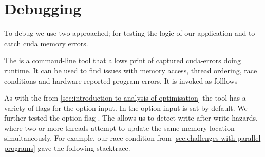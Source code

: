 \section{Debugging}
\label{sec:debugging and profiling}
To debug we use two approached;  for testing the logic of our application and  to catch cuda memory errors.

The  is a command-line tool that allows print of captured cuda-errors doing runtime.
It can be used to find issues with memory access, thread ordering, race conditions and hardware reported program errors.
It is invoked as folllows
%
\begin{quote}
\end{quote}
%
As with the  from \cref{sec:introduction to analysis of optimisation} the  tool has a variety of flags for the option input.
In the option input  is sat by default.
We further tested the option flag .
The  allows us to detect write-after-write hazards, where two or more threads attempt to update the same memory location simultaneously.
For example, our race condition from \cref{sec:challenges with parallel programs} gave the following stacktrace.~\cite{cudamemcheck2015doc}
